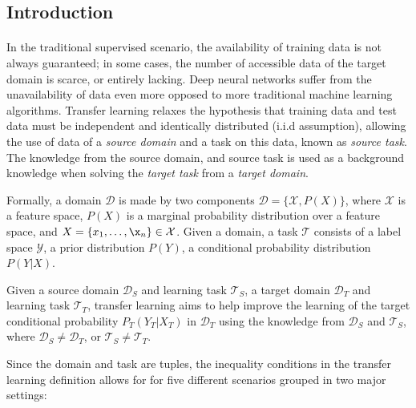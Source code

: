 \subsection{Introduction}
\paragraph{}
In the traditional supervised scenario, the availability of training data is not always guaranteed; in some cases, the number of accessible data of the target domain is scarce, or entirely lacking. Deep neural networks suffer from the unavailability of data even more opposed to more traditional machine learning algorithms. Transfer learning relaxes the hypothesis that training data and test data must be independent and identically distributed (i.i.d assumption), allowing the use of data of a \textit{source domain} and a task on this data, known as \textit{source task}. The knowledge from the source domain, and source task is used as a background knowledge when solving the \textit{target task} from a \textit{target domain}. 

Formally, a domain $\mathcal{D}$ is made by two components $\mathcal{D} = \{\mathcal{X}, P(X)\}$, where $\mathcal{X}$ is a feature space, $P(X)$ is a marginal probability distribution over a feature space, and $X = \{x_1, \dots, \x_n\} \in \mathcal{X}$. Given a domain, a task $\mathcal{T}$ 
consists of a label space $\mathcal{Y}$, a prior distribution $P(Y)$, a conditional probability distribution $P(Y|X)$. 

Given a source domain $\mathcal{D}_S$ and learning task $\mathcal{T}_S$, a target domain $\mathcal{D}_T$ and learning task $\mathcal{T}_T$, transfer learning aims to help improve the learning of the target conditional probability $P_T(Y_T|X_T)$ in $\mathcal{D}_T$ using the knowledge from $\mathcal{D}_S$ and $\mathcal{T}_S$, where $\mathcal{D}_S \neq \mathcal{D}_T$, or $\mathcal{T}_S \neq \mathcal{T}_T$.

Since the domain and task are tuples, the inequality conditions in the transfer learning definition allows for for five different scenarios grouped in two major settings:

